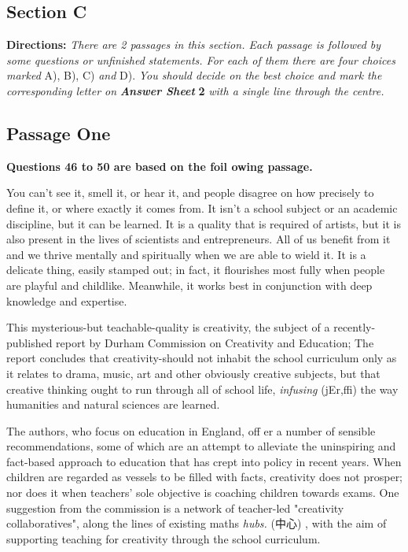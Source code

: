 \documentclass[UTF8,11pt]{ctexart}
\begin{document}
\subsection*{\textbf{Section C}}


\textbf{Directions: }\textit{There are 2 passages in this section. Each passage is followed by some questions or unfinished} \textit{statements. For each of them there are four choices marked }A), B), C) \textit{and }D). \textit{You should decide on the} \textit{best choice and mark the corresponding letter on }\textbf{\textit{Answer Sheet }}\textbf{2 }\textit{with a single line through the centre.}


\subsection*{\textbf{Passage One}}


\textbf{Questions 46 to 50 are based on the foil owing passage.}


You can't see it, smell it, or hear it, and people disagree on how precisely to define it, or where exactly it comes from. It isn't a school subject or an academic discipline, but it can be learned. It is a quality that is required of artists, but it is also present in the lives of scientists and entrepreneurs. All of us benefit from it and we thrive mentally and spiritually when we are able to wield it. It is a delicate thing, easily stamped out; in fact, it flourishes most fully when people are playful and childlike. Meanwhile, it works best in conjunction with deep knowledge and expertise.


This mysterious-but teachable-quality is creativity, the subject of a recently-published report by Durham\textperiodcentered{} Commission on Creativity and Education; The report concludes that\textperiodcentered{} creativity-should not inhabit the school curriculum only as it relates to drama, music, art and other obviously creative subjects, but that creative thinking ought to run through all of school life, \textit{infusing }(jEr,ffi) the way humanities and natural sciences are learned.


The authors, who focus on education in England, off er a number of sensible recommendations, some of which are an attempt to alleviate the uninspiring and fact-based approach to education that has crept into policy in recent years. When children are regarded as vessels to be filled with facts, creativity does not prosper; nor does it when teachers' sole objective is coaching children towards exams. One suggestion from the commission is a network of teacher-led "creativity collaboratives", along the lines of existing maths \textit{hubs. }(中心) , with the aim of supporting teaching for creativity through the school curriculum.
\end{document}

